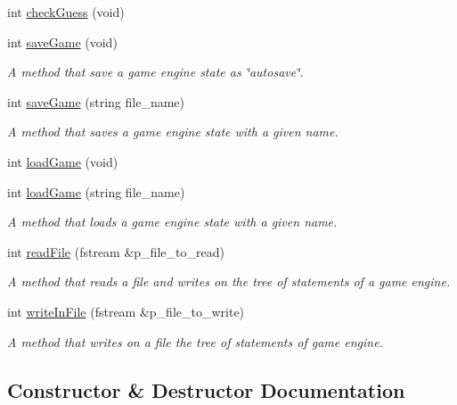 \begin{DoxyCompactItemize}
int \hyperlink{classGameEngine_a01b9a5c3114b34869021b391147e61ba}{check\+Guess} (void)
\item 
int \hyperlink{classGameEngine_ad9b78e44d4eea9bcb98bd58876b1ba7d}{save\+Game} (void)
\begin{DoxyCompactList}\small\item\em A method that save a game engine state as \char`\"{}autosave\char`\"{}. \end{DoxyCompactList}\item 
int \hyperlink{classGameEngine_a7e16dc069ce815e79fcef09c19a1a97a}{save\+Game} (string file\+\_\+name)
\begin{DoxyCompactList}\small\item\em A method that saves a game engine state with a given name. \end{DoxyCompactList}\item 
int \hyperlink{classGameEngine_a6c6612550ae0b18be1540881859cdaca}{load\+Game} (void)
\item 
int \hyperlink{classGameEngine_a66fc0b13065015768f4fb6f949329937}{load\+Game} (string file\+\_\+name)
\begin{DoxyCompactList}\small\item\em A method that loads a game engine state with a given name. \end{DoxyCompactList}\item 
int \hyperlink{classGameEngine_afa0b28d7d51e3f69d470943e50f017e6}{read\+File} (fstream \&p\+\_\+file\+\_\+to\+\_\+read)
\begin{DoxyCompactList}\small\item\em A method that reads a file and writes on the tree of statements of a game engine. \end{DoxyCompactList}\item 
int \hyperlink{classGameEngine_adeba29a50b810c32e9b6c8018969325b}{write\+In\+File} (fstream \&p\+\_\+file\+\_\+to\+\_\+write)
\begin{DoxyCompactList}\small\item\em A method that writes on a file the tree of statements of game engine. \end{DoxyCompactList}\end{DoxyCompactItemize}


\subsection{Constructor \& Destructor Documentation}
